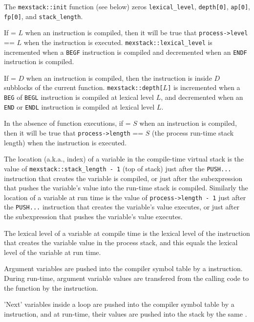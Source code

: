\documentclass[12pt]{article}
\begin{document}
\begin{indpar}
The {\tt mexstack::init} function (see below) zeros {\tt lexical\_level},
{\tt depth[0]}, {\tt ap[0]}, {\tt fp[0]}, and {\tt stack\_length}.

If  = $L$
when an instruction is compiled,
then it will be true that {\tt process->level} == $L$ when the instruction
is executed.
{\tt mexstack::\EOL lexical\_\EOL level} is incremented when a {\tt BEGF}
instruction is compiled and decremented when an {\tt ENDF}
instruction is compiled.

If  = $D$\label{DEPTH}
when an instruction is compiled,
then the instruction is inside $D$ subblocks of the current function.
{\tt mexstack::depth[$L$]} is incremented when a {\tt BEG} of {\tt BEGL}
instruction is compiled at lexical level $L$, and decremented when
an {\tt END} or {\tt ENDL} instruction is compiled at lexical level $L$.

In the absence of function executions, if
 = $S$\label{STACK-LENGTH}
when an instruction is compiled,
then it will be true that {\tt process->length} == $S$ (the process run-time
stack length) when the instruction is executed.

The location (a.k.a., index) of a variable in the compile-time virtual stack
is the value of
{\tt mexstack::\EOL stack\_\EOL length - 1} (top of stack)
just after the {\tt PUSH...}
instruction that creates the variable is compiled, or just after
the subexpression that pushes the variable's value into the run-time
stack is compiled.
Similarly the location of a variable at run time is the value of
{\tt process->length - 1} just after the {\tt PUSH...}
instruction that creates the variable's value executes, or just after
the subexpression that pushes the variable's value executes.

The lexical level of a variable at compile time is the lexical
level of the instruction that creates the variable value in
the process stack, and this equals the lexical level of the variable
at run time.

Argument variables are pushed into
the compiler symbol table by a  instruction.
During run-time, argument variable values are transfered from the
calling code to the function by the  instruction.

'Next' variables inside a loop are pushed into the compiler symbol
table by a  instruction, and at run-time, their values are
pushed into the stack by the same .


\end{indpar}
\end{document}
